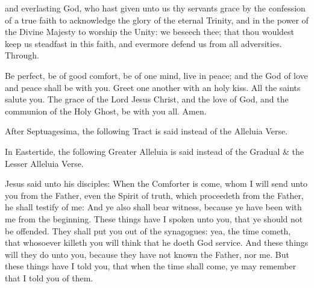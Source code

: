 \collect
{} and everlasting God, who hast given unto us thy servants grace by the confession of a true faith to acknowledge the glory of the eternal Trinity, and in the power of the Divine Majesty to worship the Unity: we beseech thee; that thou wouldest keep us steadfast in this faith, and evermore defend us from all adversities. Through.

 Be perfect, be of good comfort, be of one mind, live in peace; and the God of love and peace shall be with you. Greet one another with an holy kiss. All the saints salute you. The grace of the Lord Jesus Christ, and the love of God, and the communion of the Holy Ghost, be with you all. Amen.


\begin{rubric}
    After Septuagesima, the following Tract is said instead of the Alleluia Verse.
\end{rubric}

\begin{rubric}
    In Eastertide, the following Greater Alleluia is said instead of the Gradual \& the Lesser Alleluia Verse.
\end{rubric}

\vspace{-0.25\baselineskip}


\vspace{-0.1\baselineskip}

 Jesus said unto his disciples: When the Comforter is come, whom I will send unto you from the Father, even the Spirit of truth, which proceedeth from the Father, he shall testify of me: And ye also shall bear witness, because ye have been with me from the beginning. These things have I spoken unto you, that ye should not be offended. They shall put you out of the synagogues: yea, the time cometh, that whosoever killeth you will think that he doeth God service. And these things will they do unto you, because they have not known the Father, nor me. But these things have I told you, that when the time shall come, ye may remember that I told you of them.

